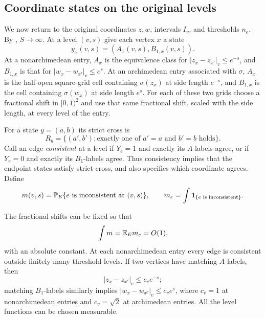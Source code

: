 \subsection{Coordinate states on the original levels}

We now return to the original coordinates $z,w$, intervals $I_v$, and
thresholds $n_e$. By , $S\to\infty$.
At a level $(v,s)$ give each vertex $x$ a state
\[
 y_x(v,s)=(A_x(v,s),B_{1,x}(v,s)).
\]
At a nonarchimedean entry, $A_x$ is the equivalence class for
$|z_x-z_{x'}|_v\le e^{-s}$, and $B_{1,x}$ is that for
$|w_x-w_{x'}|_v\le e^s$. At an archimedean entry associated with $\sigma$,
$A_x$ is the half-open square-grid cell containing $\sigma(z_x)$ at
side length $e^{-s}$, and $B_{1,x}$ is the cell containing $\sigma(w_x)$
at side length $e^s$. For each of these two grids choose a fractional
shift in $[0,1)^2$ and use that same fractional shift, scaled with the
side length, at every level of the entry.

For a state $y=(a,b)$ its strict cross is
\begin{equation}\label{ht:strict-cross}
 R_y=\{(a',b'):\text{exactly one of }a'=a\text{ and }b'=b\text{ holds}\}.
\end{equation}
Call an edge \emph{consistent} at a level if $Y_e=1$ and exactly its
$A$-labels agree, or if $Y_e=0$ and exactly its $B_1$-labels agree.
Thus consistency implies that the endpoint states satisfy strict cross,
and also specifies which coordinate agrees. Define
\begin{equation}\label{ht:inconsistency}
 m(v,s)=\mathbb P_E\{e\text{ is inconsistent at }(v,s)\},\qquad
 m_e=\int\mathbf1_{\{e\text{ is inconsistent}\}}.
\end{equation}

\begin{lemma}\label{ht:states}
The fractional shifts can be fixed so that
\begin{equation}\label{ht:inconsistency-budget}
 \int m=\mathbb E_E m_e=O(1),
\end{equation}
with an absolute constant. At each nonarchimedean entry every edge is
consistent outside finitely many threshold levels. If two vertices
have matching $A$-labels, then
\[
 |z_x-z_{x'}|_v\le c_v e^{-s};
\]
matching $B_1$-labels similarly implies
$|w_x-w_{x'}|_v\le c_v e^s$, where $c_v=1$ at nonarchimedean entries
and $c_v=\sqrt2$ at archimedean entries.
All the level functions can be chosen measurable.
\end{lemma}

